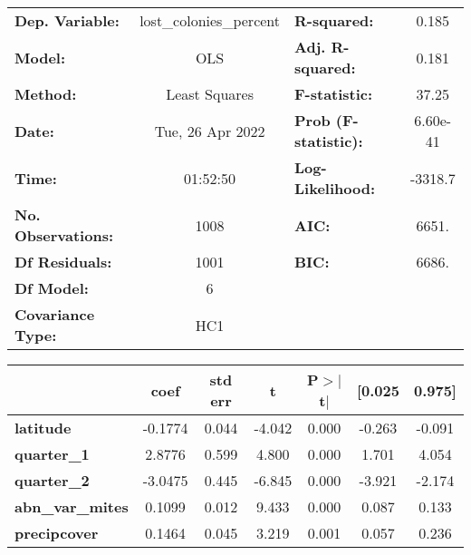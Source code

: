 \begin{center}
\begin{tabular}{lclc}
\toprule
\textbf{Dep. Variable:}    & lost\_colonies\_percent & \textbf{  R-squared:         } &     0.185   \\
\textbf{Model:}            &           OLS           & \textbf{  Adj. R-squared:    } &     0.181   \\
\textbf{Method:}           &      Least Squares      & \textbf{  F-statistic:       } &     37.25   \\
\textbf{Date:}             &     Tue, 26 Apr 2022    & \textbf{  Prob (F-statistic):} &  6.60e-41   \\
\textbf{Time:}             &         01:52:50        & \textbf{  Log-Likelihood:    } &   -3318.7   \\
\textbf{No. Observations:} &            1008         & \textbf{  AIC:               } &     6651.   \\
\textbf{Df Residuals:}     &            1001         & \textbf{  BIC:               } &     6686.   \\
\textbf{Df Model:}         &               6         & \textbf{                     } &             \\
\textbf{Covariance Type:}  &           HC1           & \textbf{                     } &             \\
\bottomrule
\end{tabular}
\begin{tabular}{lcccccc}
                         & \textbf{coef} & \textbf{std err} & \textbf{t} & \textbf{P$> |$t$|$} & \textbf{[0.025} & \textbf{0.975]}  \\
\midrule
\textbf{latitude}        &      -0.1774  &        0.044     &    -4.042  &         0.000        &       -0.263    &       -0.091     \\
\textbf{quarter\_1}      &       2.8776  &        0.599     &     4.800  &         0.000        &        1.701    &        4.054     \\
\textbf{quarter\_2}      &      -3.0475  &        0.445     &    -6.845  &         0.000        &       -3.921    &       -2.174     \\
\textbf{abn\_var\_mites} &       0.1099  &        0.012     &     9.433  &         0.000        &        0.087    &        0.133     \\
\textbf{precipcover}     &       0.1464  &        0.045     &     3.219  &         0.001        &        0.057    &        0.236     \\

\end{tabular}
\end{center}
